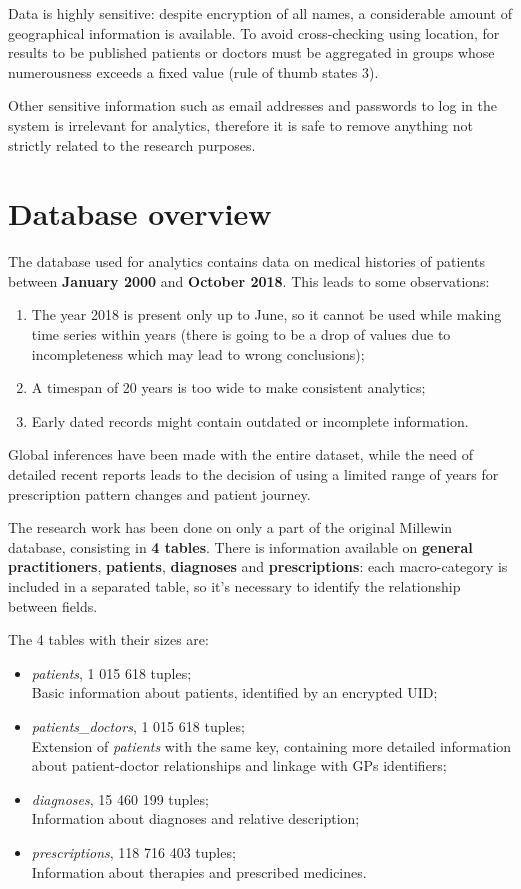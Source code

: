 Data is highly sensitive: despite encryption of all names, a considerable amount of geographical information is available. To avoid cross-checking using location, for results to be published patients or doctors must be aggregated in groups whose numerousness exceeds a fixed value (rule of thumb states 3). 

Other sensitive information such as email addresses and passwords to log in the system is irrelevant for analytics, therefore it is safe to remove anything not strictly related to the research purposes.

\section{Database overview}
The database used for analytics contains data on medical histories of patients between \textbf{January 2000} and \textbf{October 2018}. This leads to some observations:
\begin{enumerate}
	\item The year 2018 is present only up to June, so it cannot be used while making time series within years (there is going to be a drop of values due to incompleteness which may lead to wrong conclusions);
	\item A timespan of 20 years is too wide to make consistent analytics;
	\item Early dated records might contain outdated or incomplete information.
\end{enumerate}

Global inferences have been made with the entire dataset, while the need of detailed recent reports leads to the decision of using a limited range of years for prescription pattern changes and patient journey.

The research work has been done on only a part of the original Millewin database, consisting in \textbf{4 tables}. There is information available on \textbf{general practitioners}, \textbf{patients}, \textbf{diagnoses} and \textbf{prescriptions}: each macro-category is included in a separated table, so it's necessary to identify the relationship between fields.

The 4 tables with their sizes are:
\begin{itemize}
	\item \textit{patients}, 1 015 618 tuples; \\
	Basic information about patients, identified by an encrypted UID;
	\item \textit{patients\_doctors}, 1 015 618 tuples; \\
	Extension of \textit{patients} with the same key, containing more detailed information about patient-doctor relationships and linkage with GPs identifiers;
	\item \textit{diagnoses}, 15 460 199 tuples; \\
	Information about diagnoses and relative description;
	\item \textit{prescriptions}, 118 716 403 tuples; \\
	Information about therapies and prescribed medicines.
\end{itemize}

